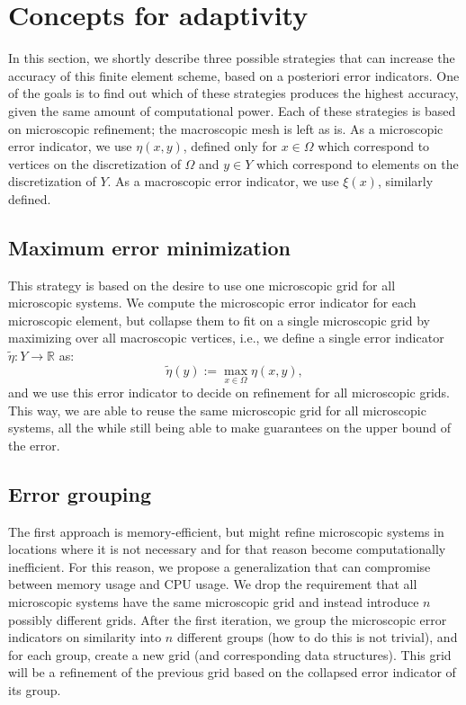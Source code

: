 \documentclass{article}
\newcommand{\R}{\mathbb{ R}}
\begin{document}
\section{Concepts for adaptivity}
\label{sec:adaptivity}

In this section, we shortly describe three possible strategies that can increase the accuracy of this finite element scheme, based on a posteriori error indicators.
One of the goals is to find out which of these strategies produces the highest accuracy, given the same amount of computational power.
Each of these strategies is based on microscopic refinement; the macroscopic mesh is left as is.
As a microscopic error indicator, we use $\eta(x,y)$, defined only for $x \in \Omega$ which correspond to vertices on the discretization of $\Omega$ and $y \in Y$ which correspond to elements on the discretization of $Y$.
As a macroscopic error indicator, we use $\xi(x)$, similarly defined.

\subsection{Maximum error minimization}
\label{sec:max_min}
This strategy is based on the desire to use one microscopic grid for all microscopic systems.
We compute the microscopic error indicator for each microscopic element, but collapse them to fit on a single microscopic grid by maximizing over all macroscopic vertices, i.e., we define a single error indicator $\tilde{\eta}:Y \to \R$ as:
\begin{equation}
    \tilde{\eta}(y) := \max_{x\in \Omega} \eta(x,y),
\end{equation}
and we use this error indicator to decide on refinement for all microscopic grids.
This way, we are able to reuse the same microscopic grid for all microscopic systems, all the while still being able to make guarantees on the upper bound of the error.
\subsection{Error grouping}
\label{sec:error_grouping}
The first approach is memory-efficient, but might refine microscopic systems in locations where it is not necessary and for that reason become computationally inefficient.
For this reason, we propose a generalization that can compromise between memory usage and CPU usage.
We drop the requirement that all microscopic systems have the same microscopic grid and instead introduce $n$ possibly different grids.
After the first iteration, we group the microscopic error indicators on similarity into $n$ different groups (how to do this is not trivial), and for each group, create a new grid (and corresponding data structures).
This grid will be a refinement of the previous grid based on the collapsed error indicator of its group.
\end{document}
